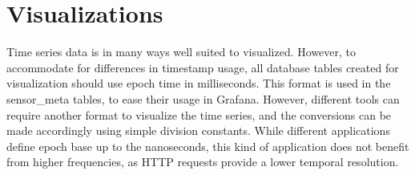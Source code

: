 \section{Visualizations}\label{sec:visuals}
Time series data is in many ways well suited to visualized. However,
to accommodate for differences in timestamp usage, all database tables created for visualization should use epoch time in milliseconds. This format is used in the sensor\_meta tables, to ease their usage in Grafana. However, different tools can require another format to visualize the time series, and the conversions can be made accordingly using simple division constants. While different applications define epoch base up to the nanoseconds, this kind of application does not benefit from higher frequencies, as HTTP requests provide a lower temporal resolution. 

